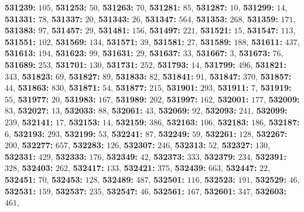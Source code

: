 \textsf{\bfseries 531239:} $105$, \textsf{\bfseries 531253:} $50$, \textsf{\bfseries 531263:} $70$, \textsf{\bfseries 531281:} $85$, \textsf{\bfseries 531287:} $10$, \textsf{\bfseries 531299:} $14$, \textsf{\bfseries 531331:} $78$, \textsf{\bfseries 531337:} $20$, \textsf{\bfseries 531343:} $26$, \textsf{\bfseries 531347:} $564$, \textsf{\bfseries 531353:} $268$, \textsf{\bfseries 531359:} $171$, \textsf{\bfseries 531383:} $97$, \textsf{\bfseries 531457:} $29$, \textsf{\bfseries 531481:} $156$, \textsf{\bfseries 531497:} $221$, \textsf{\bfseries 531521:} $15$, \textsf{\bfseries 531547:} $113$, \textsf{\bfseries 531551:} $102$, \textsf{\bfseries 531569:} $134$, \textsf{\bfseries 531571:} $39$, \textsf{\bfseries 531581:} $27$, \textsf{\bfseries 531589:} $188$, \textsf{\bfseries 531611:} $437$, \textsf{\bfseries 531613:} $194$, \textsf{\bfseries 531623:} $99$, \textsf{\bfseries 531631:} $29$, \textsf{\bfseries 531637:} $33$, \textsf{\bfseries 531667:} $3$, \textsf{\bfseries 531673:} $76$, \textsf{\bfseries 531689:} $253$, \textsf{\bfseries 531701:} $130$, \textsf{\bfseries 531731:} $252$, \textsf{\bfseries 531793:} $14$, \textsf{\bfseries 531799:} $496$, \textsf{\bfseries 531821:} $343$, \textsf{\bfseries 531823:} $69$, \textsf{\bfseries 531827:} $89$, \textsf{\bfseries 531833:} $82$, \textsf{\bfseries 531841:} $91$, \textsf{\bfseries 531847:} $370$, \textsf{\bfseries 531857:} $44$, \textsf{\bfseries 531863:} $830$, \textsf{\bfseries 531871:} $54$, \textsf{\bfseries 531877:} $215$, \textsf{\bfseries 531901:} $293$, \textsf{\bfseries 531911:} $7$, \textsf{\bfseries 531919:} $55$, \textsf{\bfseries 531977:} $20$, \textsf{\bfseries 531983:} $167$, \textsf{\bfseries 531989:} $202$, \textsf{\bfseries 531997:} $162$, \textsf{\bfseries 532001:} $177$, \textsf{\bfseries 532009:} $83$, \textsf{\bfseries 532027:} $13$, \textsf{\bfseries 532033:} $88$, \textsf{\bfseries 532061:} $43$, \textsf{\bfseries 532069:} $92$, \textsf{\bfseries 532093:} $241$, \textsf{\bfseries 532099:} $239$, \textsf{\bfseries 532141:} $17$, \textsf{\bfseries 532153:} $14$, \textsf{\bfseries 532159:} $386$, \textsf{\bfseries 532163:} $106$, \textsf{\bfseries 532183:} $186$, \textsf{\bfseries 532187:} $6$, \textsf{\bfseries 532193:} $293$, \textsf{\bfseries 532199:} $53$, \textsf{\bfseries 532241:} $87$, \textsf{\bfseries 532249:} $59$, \textsf{\bfseries 532261:} $128$, \textsf{\bfseries 532267:} $200$, \textsf{\bfseries 532277:} $657$, \textsf{\bfseries 532283:} $126$, \textsf{\bfseries 532307:} $246$, \textsf{\bfseries 532313:} $52$, \textsf{\bfseries 532327:} $130$, \textsf{\bfseries 532331:} $429$, \textsf{\bfseries 532333:} $176$, \textsf{\bfseries 532349:} $42$, \textsf{\bfseries 532373:} $333$, \textsf{\bfseries 532379:} $234$, \textsf{\bfseries 532391:} $328$, \textsf{\bfseries 532403:} $262$, \textsf{\bfseries 532417:} $133$, \textsf{\bfseries 532421:} $375$, \textsf{\bfseries 532439:} $663$, \textsf{\bfseries 532447:} $22$, \textsf{\bfseries 532451:} $70$, \textsf{\bfseries 532453:} $128$, \textsf{\bfseries 532489:} $487$, \textsf{\bfseries 532501:} $116$, \textsf{\bfseries 532523:} $191$, \textsf{\bfseries 532529:} $46$, \textsf{\bfseries 532531:} $159$, \textsf{\bfseries 532537:} $235$, \textsf{\bfseries 532547:} $46$, \textsf{\bfseries 532561:} $167$, \textsf{\bfseries 532601:} $347$, \textsf{\bfseries 532603:} $461$, 
